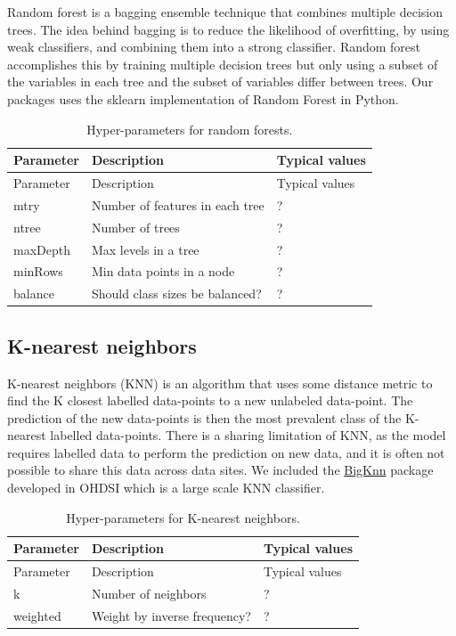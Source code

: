 \documentclass[11pt]{book}
\theoremstyle{definition}
\theoremstyle{definition}
\theoremstyle{definition}
\theoremstyle{remark}
\begin{document}
Random forest is a bagging ensemble technique that combines multiple decision trees. The idea behind bagging is to reduce the likelihood of overfitting, by using weak classifiers, and combining them into a strong classifier. Random forest accomplishes this by training multiple decision trees but only using a subset of the variables in each tree and the subset of variables differ between trees. Our packages uses the sklearn implementation of Random Forest in Python.   

\begin{longtable}[]{@{}lll@{}}
\caption{\label{tab:randomForestParameters} Hyper-parameters for random forests.}\tabularnewline
\toprule
Parameter & Description & Typical values\tabularnewline
\midrule
\endfirsthead
\toprule
Parameter & Description & Typical values\tabularnewline
\midrule
\endhead
mtry & Number of features in each tree & ?\tabularnewline
ntree & Number of trees & ?\tabularnewline
maxDepth & Max levels in a tree & ?\tabularnewline
minRows & Min data points in a node & ?\tabularnewline
balance & Should class sizes be balanced? & ?\tabularnewline
\bottomrule
\end{longtable}

\hypertarget{k-nearest-neighbors}{%
\subsection{K-nearest neighbors}\label{k-nearest-neighbors}}

K-nearest neighbors (KNN) is an algorithm that uses some distance metric to find the K closest labelled data-points to a new unlabeled data-point. The prediction of the new data-points is then the most prevalent class of the K-nearest labelled data-points. There is a sharing limitation of KNN, as the model requires labelled data to perform the prediction on new data, and it is often not possible to share this data across data sites. We included the \href{https://github.com/OHDSI/BigKnn}{BigKnn} package developed in OHDSI which is a large scale KNN classifier.  

\begin{longtable}[]{@{}lll@{}}
\caption{\label{tab:knnParameters} Hyper-parameters for K-nearest neighbors.}\tabularnewline
\toprule
Parameter & Description & Typical values\tabularnewline
\midrule
\endfirsthead
\toprule
Parameter & Description & Typical values\tabularnewline
\midrule
\endhead
k & Number of neighbors & ?\tabularnewline
weighted & Weight by inverse frequency? & ?\tabularnewline
\bottomrule
\end{longtable}
\end{document}

